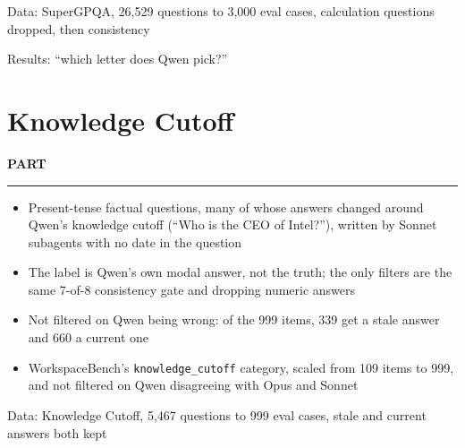 \documentclass[aspectratio=169, 9pt, t]{beamer}
\newcommand{\parthead}{%
  {\color{accent}\usebeamerfont{date}\bfseries\addfontfeatures{LetterSpace=8}PART \insertsectionnumber\par}\vspace{0.3mm}
  {\displayfont\bfseries\fontsize{12}{14}\selectfont \insertsectionhead\par}\vspace{0.6mm}
  {\color{accent}\rule{\textwidth}{0.5pt}}\par\smallskip}
\begin{document}
\begin{frame}{Data: SuperGPQA, 26,529 questions to 3,000 eval cases, calculation questions dropped, then consistency}
\end{frame}

\begin{frame}{Results: “which letter does Qwen pick?”}
\end{frame}

\section{Knowledge Cutoff}
\begin{frame}
  \parthead
  \begin{itemize}
    \item Present-tense factual questions, many of whose answers changed around Qwen's knowledge cutoff (``Who is the CEO of
      Intel?''), written by Sonnet subagents with no date in the question
    \item The label is Qwen's own modal answer, not the truth; the only filters are the same 7-of-8 consistency gate and dropping
      numeric answers
    \item Not filtered on Qwen being wrong: of the 999 items, 339 get a stale answer and 660 a current one
    \item WorkspaceBench's \texttt{knowledge\_cutoff} category, scaled from 109 items to 999, and not filtered on Qwen
      disagreeing with Opus and Sonnet
  \end{itemize}
\end{frame}

\begin{frame}{Data: Knowledge Cutoff, 5,467 questions to 999 eval cases, stale and current answers both kept}
\end{frame}
\end{document}
